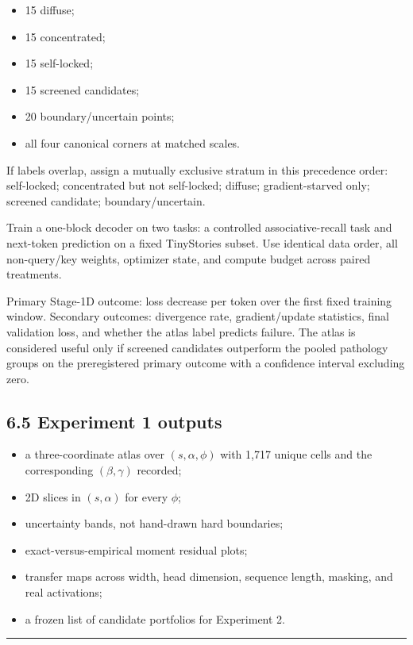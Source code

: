 \documentclass[11pt,letterpaper]{article}
\theoremstyle{definition}
\begin{document}
\begin{itemize}
  \item 15 diffuse;
  \item 15 concentrated;
  \item 15 self-locked;
  \item 15 screened candidates;
  \item 20 boundary/uncertain points;
  \item all four canonical corners at matched scales.
\end{itemize}
If labels overlap, assign a mutually exclusive stratum in this precedence order: self-locked; concentrated but not self-locked; diffuse; gradient-starved only; screened candidate; boundary/uncertain.

Train a one-block decoder on two tasks: a controlled associative-recall task and next-token prediction on a fixed TinyStories subset. Use identical data order, all non-query/key weights, optimizer state, and compute budget across paired treatments.

Primary Stage-1D outcome: loss decrease per token over the first fixed training window. Secondary outcomes: divergence rate, gradient/update statistics, final validation loss, and whether the atlas label predicts failure. The atlas is considered useful only if screened candidates outperform the pooled pathology groups on the preregistered primary outcome with a confidence interval excluding zero.

\subsection{6.5 Experiment 1 outputs}
\begin{itemize}
  \item a three-coordinate atlas over $(s,\alpha,\phi)$ with 1,717 unique cells and the corresponding $(\beta,\gamma)$ recorded;
  \item 2D slices in $(s,\alpha)$ for every $\phi$;
  \item uncertainty bands, not hand-drawn hard boundaries;
  \item exact-versus-empirical moment residual plots;
  \item transfer maps across width, head dimension, sequence length, masking, and real activations;
  \item a frozen list of candidate portfolios for Experiment 2.
\end{itemize}
\vspace{0.35em}\hrule\vspace{0.35em}
\end{document}
